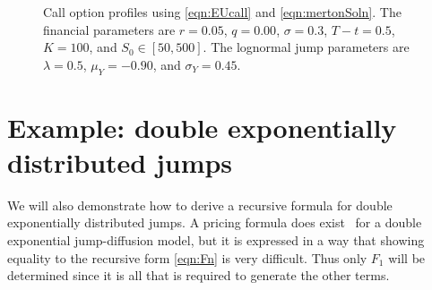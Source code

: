 \begin{figure}[!h]
		\centering
		\caption{Call option profiles using \eqref{eqn:EUcall} and \eqref{eqn:mertonSoln}. The financial parameters are $r = 0.05$, $q=0.00$, $\sigma = 0.3$, $T-t = 0.5$, $K = 100$, and $S_0 \in [50,500]$. The lognormal jump parameters are $\lambda = 0.5$, $\mu_Y = -0.90$, and $\sigma_Y = 0.45$.}
		\label{fig:optionComp}
\end{figure}

\section{Example: double exponentially distributed jumps}
We will also demonstrate how to derive a recursive formula for double exponentially distributed jumps. A pricing formula does exist~\cite{Kou2002, Kou2004} for a double exponential jump-diffusion model, but it is expressed in a way that showing equality to the recursive form \eqref{eqn:Fn} is very difficult. Thus only $F_1$ will be determined since it is all that is required to generate the other terms.

